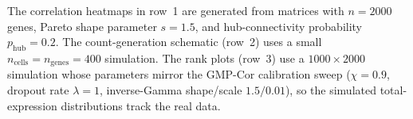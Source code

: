\medskip
\noindent
The correlation heatmaps in row~1 are generated from matrices with $n = 2000$ genes,
Pareto shape parameter $s = 1.5$, and hub-connectivity probability
$p_\mathrm{hub} = 0.2$.
The count-generation schematic (row~2) uses a small
$n_\mathrm{cells} = n_\mathrm{genes} = 400$ simulation. The rank plots (row~3) use a
$1000 \times 2000$ simulation whose parameters mirror the GMP-Cor calibration sweep
($\chi = 0.9$, dropout rate $\lambda = 1$, inverse-Gamma shape/scale $1.5/0.01$), so the
simulated total-expression distributions track the real data.
